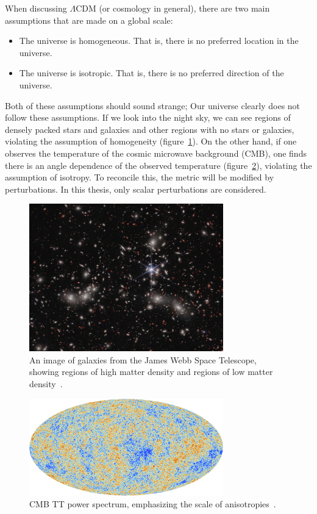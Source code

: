 When discussing $\Lambda$CDM (or cosmology in general), there are two main assumptions that are made on a global scale:
\begin{itemize}
    \item The universe is homogeneous. That is, there is no preferred location in the universe.
    \item The universe is isotropic. That is, there is no preferred direction of the universe.
\end{itemize}
Both of these assumptions should sound strange; Our universe clearly does not follow these assumptions. If we look into the night sky, we can see regions of densely packed stars and galaxies and other regions with no stars or galaxies, violating the assumption of homogeneity (figure~\ref{fig:galaxy_map}). On the other hand, if one observes the temperature of the cosmic microwave background (CMB), one finds there is an angle dependence of the observed temperature (figure~\ref{fig:cmb_tt_map}), violating the assumption of isotropy. To reconcile this, the metric will be modified by perturbations. In this thesis, only scalar perturbations are considered.
\begin{figure}[ht]
    \centering
    \includegraphics[width=0.75\textwidth]{plots/weic2305a.jpg}
    \caption{An image of galaxies from the James Webb Space Telescope, showing regions of high matter density and regions of low matter density~\cite{webb_clusters}.}
    \label{fig:galaxy_map}
\end{figure}
\begin{figure}[ht]
    \centering
    \includegraphics[width=0.75\textwidth]{plots/Planck_CMB.jpg}
    \caption{CMB TT power spectrum, emphasizing the scale of anisotropies~\cite{planck_CMB}.}
    \label{fig:cmb_tt_map}
\end{figure}

